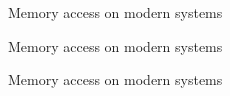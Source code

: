 \documentclass[NET,english,aspectratio=169,notitleframe]{tumbeamer}
\begin{document}
\begin{frame}{Memory access on modern systems}
\centering
\end{frame}

\begin{frame}{Memory access on modern systems}
\centering
\end{frame}

\begin{frame}{Memory access on modern systems}
\centering
\end{frame}

%
%
%
%
\end{document}
